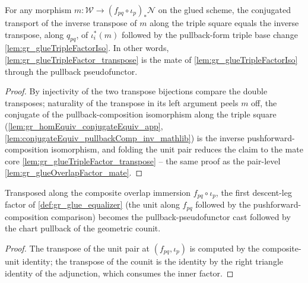 \begin{lemma}

  \label{lem:gr_glueTripleFactor_mate}
  For any morphism \(m : \mathcal{W} \to (f_{pq}\circ\iota_p)_{*}\mathcal{N}\) on the
  glued scheme, the conjugated transport of the inverse transpose of \(m\) along the
  triple square equals the inverse transpose, along \(q_{pq}\), of \(\iota_i^{*}(m)\)
  followed by the pullback-form triple base change \cref{lem:gr_glueTripleFactorIso}. In
  other words, \cref{lem:gr_glueTripleFactor_transpose} is the mate of
  \cref{lem:gr_glueTripleFactorIso} through the pullback pseudofunctor.
\end{lemma}
\begin{proof}
    \leanok
  By injectivity of the two transpose bijections compare the double transposes;
  naturality of the transpose in its left argument peels \(m\) off, the conjugate of the
  pullback-composition isomorphism along the triple square
  (\cref{lem:gr_homEquiv_conjugateEquiv_app},
  \cref{lem:conjugateEquiv_pullbackComp_inv_mathlib}) is the inverse
  pushforward-composition isomorphism, and folding the unit pair reduces the claim to the
  mate core \cref{lem:gr_glueTripleFactor_transpose} -- the same proof as the pair-level
  \cref{lem:gr_glueOverlapFactor_mate}.
\end{proof}

\begin{lemma}

  \label{lem:gr_glueLegA_component_transpose}
  Transposed along the composite overlap immersion \(f_{pq}\circ\iota_p\), the first
  descent-leg factor of \cref{def:gr_glue_equalizer} (the unit along \(f_{pq}\) followed
  by the pushforward-composition comparison) becomes the pullback-pseudofunctor cast
  followed by the chart pullback of the geometric counit.
\end{lemma}
\begin{proof}
  \leanok
  The transpose of the unit pair at \((f_{pq}, \iota_p)\) is computed by the
  composite-unit identity; the transpose of the counit is the identity by the right
  triangle identity of the adjunction, which consumes the inner factor.
\end{proof}

